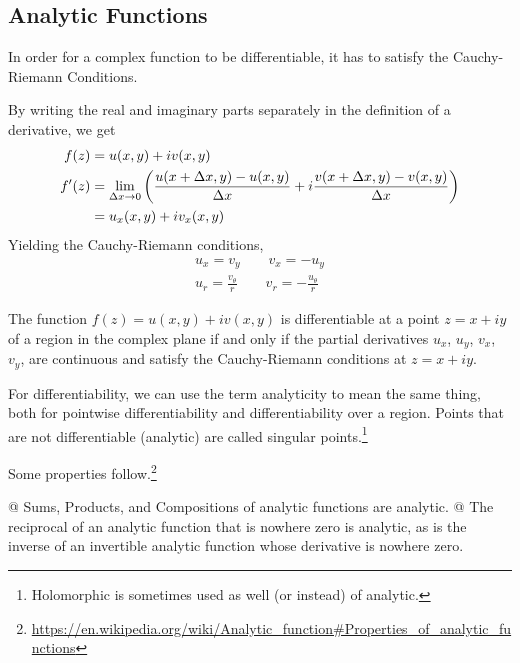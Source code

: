     \subsection{Analytic Functions}
    In order for a complex function to be differentiable, it has to satisfy
    the Cauchy-Riemann Conditions.
    \begin{thm}
        By writing the real and imaginary parts separately in the definition
        of a derivative, we get
        \begin{align*}
            f(z) &= u(x, y) + i v(x, y)\\
        f^\prime(z) &= \lim_{\Delta x \to 0} {\left( 
            \frac{u(x + \Delta x, y) - u(x, y)}{\Delta x} +
            i \frac{v(x + \Delta x, y) - v(x, y)}{\Delta x}
         \right)}\\
        &= u_x(x, y) + i v_x(x, y)
        \end{align*}
        Yielding the Cauchy-Riemann conditions,
        \begin{align*}
            u_x = v_y \qquad v_x = - u_y\\
            u_r = \frac{v_\theta}{r} \qquad v_r = -\frac{u_\theta}{r}
        \end{align*}
    \end{thm}

    \begin{thm}
        The function $f(z) = u(x, y) + i v(x, y)$ is differentiable at a
        point $z = x + iy$ of a region in the complex plane if and only if
        the partial derivatives $u_x$, $u_y$, $v_x$, $v_y$, are continuous
        and satisfy the Cauchy-Riemann conditions at $z=x+iy$.
    \end{thm}

    For differentiability, we can use the term analyticity to mean the same
    thing, both for pointwise differentiability and differentiability over a
    region. Points that are not differentiable (analytic) are called
    singular points.\footnote{Holomorphic is sometimes used as well (or
    instead) of analytic.}

    Some properties
    follow.\footnote{\url{https://en.wikipedia.org/wiki/Analytic_function\#Properties_of_analytic_functions}}
    \begin{easylist}[itemize]
        @ Sums, Products, and Compositions of analytic functions are
        analytic.
        @ The reciprocal of an analytic function that is nowhere zero is
        analytic, as is the inverse of an invertible analytic function whose
        derivative is nowhere zero.
    \end{easylist}

